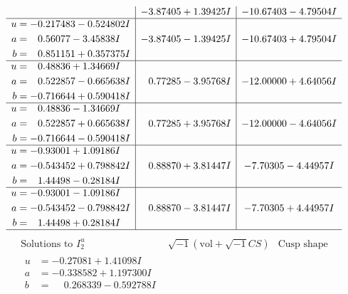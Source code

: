 \documentclass[1p]{elsarticle_modified}
\theoremstyle{definition}
\newcommand{\I}{\sqrt{-1}}
\begin{document}
$$\begin{array}{c|c|c}
 & -3.87405 + 1.39425 I & -10.67403 - 4.79504 I \\ \hline\begin{aligned}
u &= -0.217483 - 0.524802 I \\
a &= \phantom{-}0.56077 - 3.45838 I \\
b &= \phantom{-}0.851151 + 0.357375 I\end{aligned}
 & -3.87405 - 1.39425 I & -10.67403 + 4.79504 I \\ \hline\begin{aligned}
u &= \phantom{-}0.48836 + 1.34669 I \\
a &= \phantom{-}0.522857 - 0.665638 I \\
b &= -0.716644 + 0.590418 I\end{aligned}
 & \phantom{-}0.77285 - 3.95768 I & -12.00000 + 4.64056 I \\ \hline\begin{aligned}
u &= \phantom{-}0.48836 - 1.34669 I \\
a &= \phantom{-}0.522857 + 0.665638 I \\
b &= -0.716644 - 0.590418 I\end{aligned}
 & \phantom{-}0.77285 + 3.95768 I & -12.00000 - 4.64056 I \\ \hline\begin{aligned}
u &= -0.93001 + 1.09186 I \\
a &= -0.543452 + 0.798842 I \\
b &= \phantom{-}1.44498 - 0.28184 I\end{aligned}
 & \phantom{-}0.88870 + 3.81447 I & -7.70305 - 4.44957 I \\ \hline\begin{aligned}
u &= -0.93001 - 1.09186 I \\
a &= -0.543452 - 0.798842 I \\
b &= \phantom{-}1.44498 + 0.28184 I\end{aligned}
 & \phantom{-}0.88870 - 3.81447 I & -7.70305 + 4.44957 I\\
 \hline 
 \end{array}$$\newpage$$\begin{array}{c|c|c}  
\text{Solutions to }I^u_{2}& \I (\text{vol} + \sqrt{-1}CS) & \text{Cusp shape}\\
 \hline 
\begin{aligned}
u &= -0.27081 + 1.41098 I \\
a &= -0.338582 + 1.197300 I \\
b &= \phantom{-}0.268339 - 0.592788 I\end{aligned}

\end{array}$$
\end{document}

